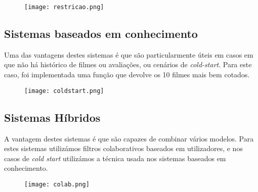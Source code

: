 \begin{figure}[H]
\centering
\texttt{[image: restricao.png]}
\end{figure}
 

\subsection{Sistemas baseados em conhecimento}

Uma das vantagens destes sistemas é que são particularmente úteis em casos em que não há histórico de filmes ou avaliações, ou cenários de \textit{cold-start}. Para este caso, foi implementada uma função que devolve os 10 filmes mais bem cotados.


\begin{figure}[H]
\centering
\texttt{[image: coldstart.png]}
\end{figure}


\subsection{Sistemas Híbridos}

A vantagem destes sistemas é que são capazes de combinar vários modelos.
Para estes sistemas utilizámos filtros colaborativos baseados em utilizadores, e nos casos de \textit{cold start} utilizámos a técnica usada nos sistemas baseados em conhecimento.

\begin{figure}[H]
\centering
\texttt{[image: colab.png]}
\end{figure}



\newpage

